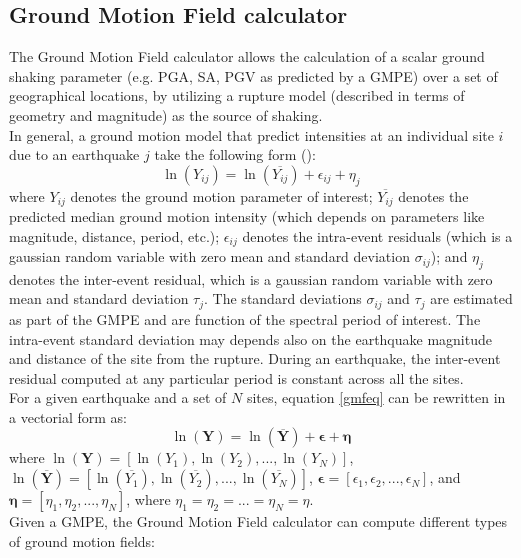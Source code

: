 %
\subsection{Ground Motion Field calculator}
The Ground Motion Field calculator allows the calculation of a scalar ground shaking parameter (e.g. PGA, SA, PGV as predicted by a GMPE) over a set of geographical locations, by utilizing a rupture model (described in terms of geometry and magnitude) as the source of shaking.\\
In general, a ground motion model that predict intensities at an individual site $i$ due to an earthquake $j$ take the following form (\cite{jayaram2009}):
\begin{equation}
\ln (Y_{ij}) = \ln (\overline{Y_{ij}})+\epsilon_{ij}+\eta_{j}
\label{gmfeq}
\end{equation}
where $Y_{ij}$ denotes the ground motion parameter of interest; $\overline{Y_{ij}}$ denotes the predicted median ground motion intensity (which depends on parameters like magnitude, distance, period, etc.); $\epsilon_{ij}$ denotes the intra-event residuals (which is a gaussian random variable with zero mean and standard deviation $\sigma_{ij}$); and $\eta_{j}$ denotes the inter-event residual, which is a gaussian random variable with zero mean and standard deviation $\tau_{j}$. The standard deviations $\sigma_{ij}$ and $\tau_{j}$ are estimated as part of the GMPE and are function of the spectral period of interest. The intra-event standard deviation may depends also on the earthquake magnitude and distance of the site from the rupture. During an earthquake, the inter-event residual computed at any particular period is constant across all the sites.\\
For a given earthquake and a set of $N$ sites, equation \ref{gmfeq} can be rewritten in a vectorial form as:
\begin{equation}
\ln (\bm{Y}) = \ln (\overline{\bm{Y}})+\bm{\epsilon}+\bm{\eta} 
\label{gmfeqvec}
\end{equation}
where ${\ln (\bm{Y})}=[\ln (Y_{1}), \ln (Y_{2}),...,\ln (Y_{N})]$, $\ln (\overline{\bm{Y}})=[\ln (\overline{Y_{1}}), \ln (\overline{Y_{2}}),...,\ln (\overline{Y_{N}})]$, $\bm{\epsilon}=[\epsilon_{1},\epsilon_{2},...,\epsilon_{N}]$, and $\bm{\eta}=[\eta_{1},\eta_{2},...,\eta_{N}]$, where $\eta_{1}=\eta_{2}=...=\eta_{N}=\eta$.\\
Given a GMPE, the Ground Motion Field calculator can compute different types of ground motion fields:

